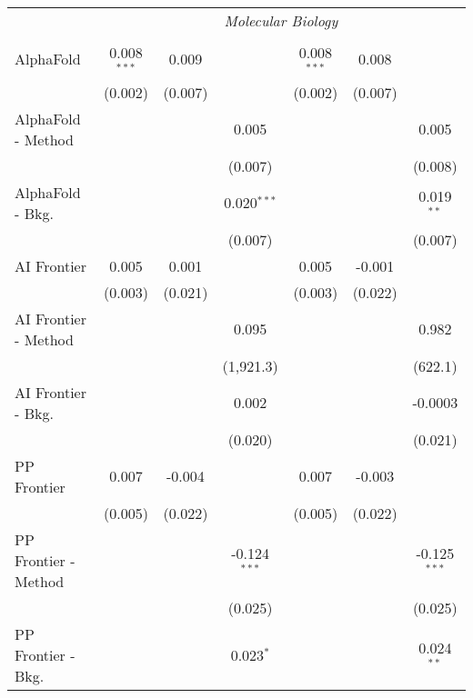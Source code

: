 \begin{tabular}{lcccccc}
 & \multicolumn{6}{c}{\textit{Molecular Biology}} \\ \\
   AlphaFold            & 0.008$^{***}$ & 0.009       &                & 0.008$^{***}$ & 0.008   &   \\   
                        & (0.002)       & (0.007)     &                & (0.002)       & (0.007) &   \\   
   AlphaFold - Method   &               &             & 0.005          &               &         & 0.005\\   
                        &               &             & (0.007)        &               &         & (0.008)\\   
   AlphaFold - Bkg.     &               &             & 0.020$^{***}$  &               &         & 0.019$^{**}$\\   
                        &               &             & (0.007)        &               &         & (0.007)\\   
   AI Frontier          & 0.005         & 0.001       &                & 0.005         & -0.001  &   \\   
                        & (0.003)       & (0.021)     &                & (0.003)       & (0.022) &   \\   
   AI Frontier - Method &               &             & 0.095          &               &         & 0.982\\   
                        &               &             & (1,921.3)      &               &         & (622.1)\\   
   AI Frontier - Bkg.   &               &             & 0.002          &               &         & -0.0003\\   
                        &               &             & (0.020)        &               &         & (0.021)\\   
   PP Frontier          & 0.007         & -0.004      &                & 0.007         & -0.003  &   \\   
                        & (0.005)       & (0.022)     &                & (0.005)       & (0.022) &   \\   
   PP Frontier - Method &               &             & -0.124$^{***}$ &               &         & -0.125$^{***}$\\   
                        &               &             & (0.025)        &               &         & (0.025)\\   
   PP Frontier - Bkg.   &               &             & 0.023$^{*}$    &               &         & 0.024$^{**}$\\   

\end{tabular}
